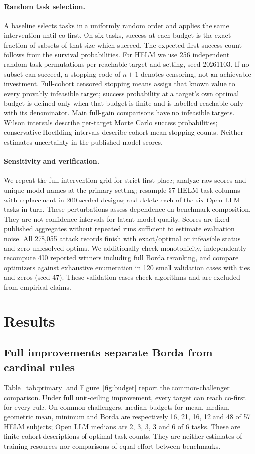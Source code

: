 \paragraph{Random task selection.}
A baseline selects tasks in a uniformly random order and applies the same intervention until co-first. On six tasks, success at each budget is the exact fraction of subsets of that size which succeed. The expected first-success count follows from the survival probabilities. For HELM we use 256 independent random task permutations per reachable target and setting, seed 20261103. If no subset can succeed, a stopping code of $n+1$ denotes censoring, not an achievable investment. Full-cohort censored stopping means assign that known value to every provably infeasible target; success probability at a target's own optimal budget is defined only when that budget is finite and is labelled reachable-only with its denominator. Main full-gain comparisons have no infeasible targets. Wilson intervals describe per-target Monte Carlo success probabilities; conservative Hoeffding intervals describe cohort-mean stopping counts. Neither estimates uncertainty in the published model scores.

\paragraph{Sensitivity and verification.}
We repeat the full intervention grid for strict first place; analyze raw scores and unique model names at the primary setting; resample 57 HELM task columns with replacement in 200 seeded designs; and delete each of the six Open LLM tasks in turn. These perturbations assess dependence on benchmark composition. They are not confidence intervals for latent model quality. Scores are fixed published aggregates without repeated runs sufficient to estimate evaluation noise. All 278,055 attack records finish with exact/optimal or infeasible status and zero unresolved optima. We additionally check monotonicity, independently recompute 400 reported winners including full Borda reranking, and compare optimizers against exhaustive enumeration in 120 small validation cases with ties and zeros (seed 47). These validation cases check algorithms and are excluded from empirical claims.

\section{Results}
\label{sec:results}
\subsection{Full improvements separate Borda from cardinal rules}
Table~\ref{tab:primary} and Figure~\ref{fig:budget} report the common-challenger comparison. Under full unit-ceiling improvement, every target can reach co-first for every rule. On common challengers, median budgets for mean, median, geometric mean, minimum and Borda are respectively 16, 21, 16, 12 and 48 of 57 HELM subjects; Open LLM medians are 2, 3, 3, 3 and 6 of 6 tasks. These are finite-cohort descriptions of optimal task counts. They are neither estimates of training resources nor comparisons of equal effort between benchmarks.

